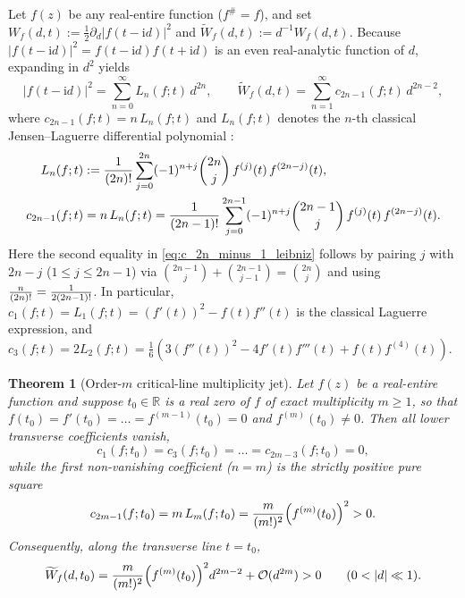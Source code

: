 \documentclass[11pt,reqno]{amsart}
\newtheorem{theorem}{Theorem}[section]
\theoremstyle{definition}
\theoremstyle{remark}
\numberwithin{equation}{section}
\newcommand{\ii}{\mathrm{i}}
\newcommand{\fac}{\mathclose{\mathchar"0021}}
\begin{document}
Let $f(z)$ be any real-entire function ($f^\# = f$), and set $W_f(d,t) := \frac{1}{2}\partial_d\lvert f(t-\ii d)\rvert^2$ and $\widetilde{W}_f(d,t) := d^{-1}W_f(d,t)$. Because $\lvert f(t-\ii d)\rvert^2 = f(t-\ii d)f(t+\ii d)$ is an even real-analytic function of $d$, expanding in $d^2$ yields \cite{Jensen1913,CsordasVarga1990,Missiaen2026Paper2}
\begin{equation}\label{eq:W_tilde_power_series}
  \lvert f(t - \ii d)\rvert^2 = \sum_{n=0}^{\infty} L_n(f; t)\,d^{2n},
  \qquad
  \widetilde{W}_f(d,t) = \sum_{n=1}^{\infty} c_{2n-1}(f; t)\,d^{2n-2},
\end{equation}
where $c_{2n-1}(f; t) = n\,L_n(f; t)$ and $L_n(f; t)$ denotes the $n$-th classical Jensen--Laguerre differential polynomial \cite{Jensen1913,Polya1927,CsordasNorfolkVarga1986,CsordasVarga1990}:
\begin{align}
  L_n(f; t) &:= \frac{1}{(2n)\fac}\sum_{j=0}^{2n}(-1)^{n+j}\binom{2n}{j}\,f^{(j)}(t)\,f^{(2n-j)}(t), \label{eq:Ln_def} \\
  c_{2n-1}(f; t) &= n\,L_n(f; t) = \frac{1}{(2n-1)\fac}\sum_{j=0}^{2n-1}(-1)^{n+j}\binom{2n-1}{j}\,f^{(j)}(t)\,f^{(2n-j)}(t). \label{eq:c_2n_minus_1_leibniz}
\end{align}
Here the second equality in \eqref{eq:c_2n_minus_1_leibniz} follows by pairing $j$ with $2n-j$ ($1 \le j \le 2n-1$) via $\binom{2n-1}{j} + \binom{2n-1}{j-1} = \binom{2n}{j}$ and using $\frac{n}{(2n)\fac} = \frac{1}{2(2n-1)\fac}$. In particular, $c_1(f; t) = L_1(f; t) = (f'(t))^2 - f(t)f''(t)$ is the classical Laguerre expression, and $c_3(f; t) = 2L_2(f; t) = \frac{1}{6}(3(f''(t))^2 - 4f'(t)f'''(t) + f(t)f^{(4)}(t))$.

\begin{theorem}[Order-$m$ critical-line multiplicity jet]\label{thm:square_cascade}
Let $f(z)$ be a real-entire function and suppose $t_0 \in \mathbb{R}$ is a real zero of $f$ of exact multiplicity $m \ge 1$, so that $f(t_0) = f'(t_0) = \dots = f^{(m-1)}(t_0) = 0$ and $f^{(m)}(t_0) \neq 0$. Then all lower transverse coefficients vanish,
\begin{equation}\label{eq:lower_c_vanish}
  c_1(f; t_0) = c_3(f; t_0) = \dots = c_{2m-3}(f; t_0) = 0,
\end{equation}
while the first non-vanishing coefficient ($n = m$) is the strictly positive pure square
\begin{equation}\label{eq:cascade_pure_square}
  c_{2m-1}(f; t_0) = m\,L_m(f; t_0) = \frac{m}{(m\fac)^2}\Bigl(f^{(m)}(t_0)\Bigr)^2 > 0.
\end{equation}
Consequently, along the transverse line $t = t_0$,
\begin{equation}\label{eq:transverse_barrier_asymptotic}
  \widetilde{W}_f(d, t_0) = \frac{m}{(m\fac)^2}\Bigl(f^{(m)}(t_0)\Bigr)^2 d^{2m-2} + \mathcal{O}(d^{2m}) > 0
  \qquad (0 < \lvert d\rvert \ll 1).
\end{equation}
\end{theorem}
\end{document}
